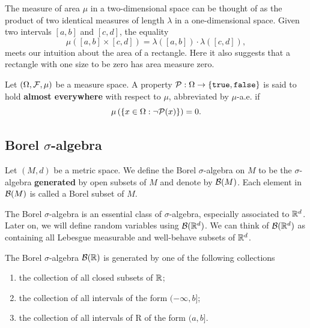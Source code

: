 \begin{example}
  The measure of area $\mu$ in a two-dimensional space can be thought of as the product of two identical measures of length $\lambda$ in a one-dimensional space. Given two intervals $[a,b]$ and $[c,d]$, the equality
  $$\mu([a,b]\times [c,d])=\lambda([a,b])\cdot\lambda([c,d]),$$
  meets our intuition about the area of a rectangle. Here it also suggests that a rectangle with one size to be zero has area measure zero.
\end{example}

\begin{definition}
  \label{definition:property-almost-everywhere}
  Let $(\Omega, \F, \mu)$ be a measure space. A property $\P:\Omega\to\{\texttt{true},\texttt{false}\}$ is said to hold \textbf{almost everywhere} with respect to $\mu$, abbreviated by $\mu$-a.e. if
  $$\mu\left(\left\{x\in\Omega : \neg \P(x)\right\}\right) = 0.$$
\end{definition}

\subsection{Borel \texorpdfstring{$\sigma$}{σ}-algebra}

\begin{definition}
  Let $(M,d)$ be a metric space. We define the Borel $\sigma$-algebra on $M$ to be the $\sigma$-algebra \textbf{generated} by open subsets of $M$ and denote by $\B(M)$. Each element in $\B(M)$ is called a Borel subset of $M$.
\end{definition}

The Borel $\sigma$-algebra is an essential class of $\sigma$-algebra, especially associated to $\RR^d$. Later on, we will define random variables using $\B(\RR^d)$. We can think of $\B(\RR^d)$ as containing all Lebesgue measurable and well-behave subsets of $\RR^d$.

\begin{proposition}
  \label{proposition:equivalent-borel-core}
  The Borel $\sigma$-algebra $\B(\RR)$ is generated by one of the following collections
  \begin{enumerate}[label=(\alph*)]
    \item the collection of all closed subsets of $\RR$;
    \item the collection of all intervals of the form $(-\infty,b]$;
    \item the collection of all intervals of R of the form $(a,b]$.
  \end{enumerate}
\end{proposition}

